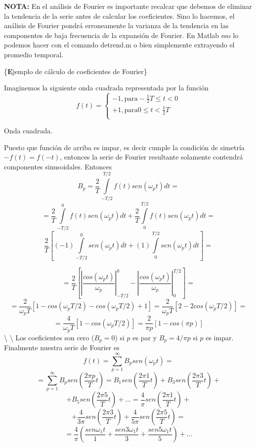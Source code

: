 \documentclass[
]{agujournal2019}
\begin{document}
\textbf{NOTA:} En el análisis de Fourier es importante recalcar que
debemos de eliminar la tendencia de la serie antes de calcular los
coeficientes. Sino lo hacemos, el análisis de Fourier pondrá
erroneamente la varianza de la tendencia en las componentes de baja
frecuencia de la expansión de Fourier. En Matlab eso lo podemos hacer
con el comando detrend.m o bien simplemente extrayendo el promedio
temporal.

\vspace{0.75cm}

\{\textbf Ejemplo de cálculo de coeficientes de Fourier\}

Imaginemos la siguiente onda cuadrada representada por la función
\[f(t)=
 \left\lbrace
  \begin{array}{l}
     -1,\text{para} -\frac{1}{2}T\le t< 0 \\
     +1,\text{para} 0\le t< \frac{1}{2}T  \\
  \end{array}
  \right.\]

\begin{center}
\end{center}
\begin{center}
Onda cuadrada.
\end{center}

Puesto que función de arriba es impar, es decir cumple la condición de
simetría \(-f(t)=f(-t)\), entonces la serie de Fourier resultante
solamente contendrá componentes sinusoidales. Entonces
\[B_p=\frac{2}{T}\int\limits_{-T/2}^{T/2} f(t) sen(\omega_p t) dt=\]
\[=\frac{2}{T}\int\limits_{-T/2}^{0} f(t) sen(\omega_p t) dt + \frac{2}{T}\int\limits_{0}^{T/2} f(t) sen(\omega_p t) dt=\]
\[\frac{2}{T}\left[ (-1) \int\limits_{-T/2}^{0} sen(\omega_p t) dt +
                   (1) \int\limits_{0}^{T/2} sen(\omega_p t) dt \right]=\]

\[=\frac{2}{T}\left[ \left|\frac{cos(\omega_p t)}{\omega_p}\right|_{-T/2}^{0}
                     -\left|\frac{cos(\omega_p t)}{\omega_p}\right|_{0}^{T/2} \right]=\]
\[=\frac{2}{\omega_p T}\left[ 1 - cos(\omega_p T/2) - cos(\omega_p T/2) + 1  \right]=
\frac{2}{\omega_p T}\left[2 -2cos(\omega_p T/2)\right]=\]
\[=\frac{4}{\omega_p T}\left[1-cos(\omega_p T/2)\right]=
\frac{2}{\pi p}\left[1-cos(\pi p)\right]\] \textbackslash{}
\textbackslash{} Los coeficientes son cero (\(B_p=0\)) si \(p\) es par y
\(B_p=4/\pi p\) si \(p\) es impar. Finalmente nuestra serie de Fourier
es \[f(t)=\sum\limits^\infty_{p=1}B_p sen(\omega_p t)=\]
\[=\sum\limits^\infty_{p=1}B_p sen\left(\frac{2\pi p}{T} t\right)=
B_1 sen\left(\frac{2\pi 1}{T} t\right) + B_3 sen\left(\frac{2\pi 3}{T} t\right) +\]
\[+B_5 sen\left(\frac{2\pi 5}{T} t\right) + ... =\frac{4}{\pi}sen\left(\frac{2\pi 1}{T} t\right) +\]
\[+\frac{4}{3\pi}sen\left(\frac{2\pi 3}{T} t\right) +\frac{4}{5\pi}sen\left(\frac{2\pi 5}{T} t\right)=\]
\[=\frac{4}{\pi}\left( \frac{sen{\omega_1 t}}{1} + \frac{sen{3\omega_1 t}}{3} + \frac{sen{5\omega_1 t}}{5}\right)+...\]
\end{document}
